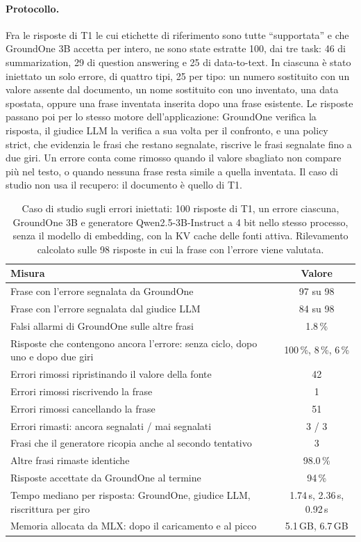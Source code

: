 \paragraph{Protocollo.} Fra le risposte di T1 le cui etichette di riferimento sono tutte ``supportata'' e che GroundOne 3B
accetta per intero, ne sono state estratte 100, dai tre task: 46 di summarization, 29 di question answering e 25 di
data-to-text. In ciascuna è stato iniettato un solo errore, di quattro tipi, 25 per tipo: un numero sostituito con un
valore assente dal documento, un nome sostituito con uno inventato, una data spostata, oppure una frase inventata inserita
dopo una frase esistente. Le risposte passano poi per lo stesso motore dell'applicazione: GroundOne verifica la risposta,
il giudice LLM la verifica a sua volta per il confronto, e una policy strict, che evidenzia le frasi che restano segnalate, riscrive le frasi segnalate fino a due giri. Un
errore conta come rimosso quando il valore sbagliato non compare più nel testo, o quando nessuna frase resta simile a
quella inventata. Il caso di studio non usa il recupero: il documento è quello di T1.

\begin{table}[htbp]
\centering
\caption{Caso di studio sugli errori iniettati: 100 risposte di T1, un errore ciascuna, GroundOne 3B e generatore
Qwen2.5-3B-Instruct a 4 bit nello stesso processo, senza il modello di embedding, con la KV cache delle fonti attiva. Rilevamento calcolato sulle 98 risposte
in cui la frase con l'errore viene valutata.}
\label{tab:studio-casestudy}
\small
\begin{tabular}{>{\raggedright\arraybackslash}p{9.4cm}c}
\toprule
Misura & Valore \\
\midrule
Frase con l'errore segnalata da GroundOne & 97 su 98 \\
Frase con l'errore segnalata dal giudice LLM & 84 su 98 \\
Falsi allarmi di GroundOne sulle altre frasi & 1.8\,\% \\
Risposte che contengono ancora l'errore: senza ciclo, dopo uno e dopo due giri & 100\,\%, 8\,\%, 6\,\% \\
Errori rimossi ripristinando il valore della fonte & 42 \\
Errori rimossi riscrivendo la frase & 1 \\
Errori rimossi cancellando la frase & 51 \\
Errori rimasti: ancora segnalati / mai segnalati & 3 / 3 \\ 
Frasi che il generatore ricopia anche al secondo tentativo & 3 \\
Altre frasi rimaste identiche & 98.0\,\% \\
Risposte accettate da GroundOne al termine & 94\,\% \\
Tempo mediano per risposta: GroundOne, giudice LLM, riscrittura per giro & 1.74\,s, 2.36\,s, 0.92\,s \\
Memoria allocata da MLX: dopo il caricamento e al picco & 5.1\,GB, 6.7\,GB \\
\bottomrule
\end{tabular}
\end{table}


